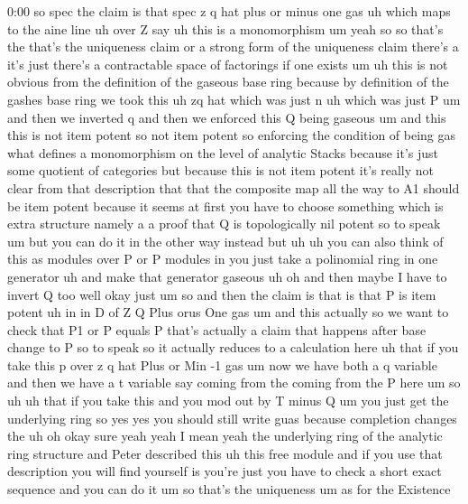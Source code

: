 \begin{unfinished}{0:00}
so  spec  the  claim  is  that  spec  z  q  hat
plus  or  minus  one
gas  uh  which  maps  to  the  aine  line  uh
over  Z
say  uh  this  is  a
monomorphism
um  yeah  so  so  that's  the  that's  the
uniqueness  claim  or  a  strong  form  of  the
uniqueness  claim  there's
a  it's  just  there's  a  contractable  space
of  factorings  if  one
exists  um
uh  this  is  not  obvious  from  the
definition  of  the  gaseous  base  ring
because  by  definition  of  the  gashes  base
ring  we  took  this  uh  zq  hat  which  was
just  n  uh  which  was  just  P  um  and  then
we  inverted  q  and  then  we  enforced  this
Q  being
gaseous  um  and  this  this  is  not  item
potent
so  not  item
potent  so  enforcing  the  condition  of
being  gas  what  defines  a  monomorphism  on
the  level  of  analytic  Stacks  because
it's  just  some  quotient  of  categories
but  because  this  is  not  item  potent  it's
really  not  clear  from  that  description
that  that  the  composite  map  all  the  way
to  A1  should  be  item  potent  because  it
seems  at  first  you  have  to  choose
something  which  is  extra  structure
namely  a  a  proof  that  Q  is  topologically
nil  potent  so  to
speak  um  but  you  can  do  it  in  the  other
way
instead  but
uh
uh  you  can  also  think  of  this  as  modules
over  P  or  P  modules  in  you  just  take  a
polinomial  ring  in  one
generator  uh  and  make  that  generator
gaseous  uh  oh  and  then  maybe  I  have  to
invert  Q  too  well
okay
just
um
so
and  then  the  claim  is
that  is  that  P  is  item
potent  uh  in  in  D  of  Z  Q  Plus  orus  One
gas  um  and  this  actually  so  we  want  to
check  that  P1  or  P  equals  P  that's
actually  a  claim  that  happens  after  base
change  to  P  so  to  speak  so  it  actually
reduces  to  a  calculation  here
uh  that  if  you  take  this  p  over  z  q  hat
Plus  or  Min  -1
gas  um  now  we  have  both  a  q  variable  and
then  we  have  a  t  variable  say  coming
from  the  coming  from  the  P  here  um
so  uh  uh  that  if  you  take  this  and  you
mod  out  by  T  minus  Q  um  you  just  get  the
underlying  ring
so  yes
yes  you  should  still  write  guas  because
completion  changes
the  uh  oh  okay  sure  yeah  yeah  I  mean
yeah  the  underlying  ring  of  the  analytic
ring  structure  and  Peter  described  this
uh
this  free  module  and  if  you  use  that
description  you  will  find  yourself  is
you're  just  you  have  to  check  a  short
exact  sequence  and  you  can  do
it
um  so  that's  the
uniqueness
um  as  for  the
Existence

\end{unfinished}

